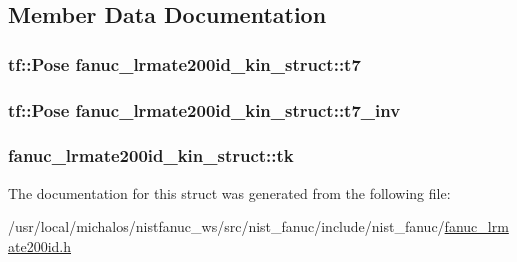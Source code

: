\subsection{Member Data Documentation}
\hypertarget{structfanuc__lrmate200id__kin__struct_affe117521f4d20a734362bcbaf0f87e6}{
\subsubsection[{t7}]{\setlength{\rightskip}{0pt plus 5cm}tf\-::\-Pose fanuc\-\_\-lrmate200id\-\_\-kin\-\_\-struct\-::t7}}\label{structfanuc__lrmate200id__kin__struct_affe117521f4d20a734362bcbaf0f87e6}
\hypertarget{structfanuc__lrmate200id__kin__struct_a92903cf8037c18791e4c93d1eabaf07b}{
\subsubsection[{t7\-\_\-inv}]{\setlength{\rightskip}{0pt plus 5cm}tf\-::\-Pose fanuc\-\_\-lrmate200id\-\_\-kin\-\_\-struct\-::t7\-\_\-inv}}\label{structfanuc__lrmate200id__kin__struct_a92903cf8037c18791e4c93d1eabaf07b}
\hypertarget{structfanuc__lrmate200id__kin__struct_a7e47a5d252d683e7c729ba1012f45529}{
\subsubsection[{tk}]{ fanuc\-\_\-lrmate200id\-\_\-kin\-\_\-struct\-::tk}}\label{structfanuc__lrmate200id__kin__struct_a7e47a5d252d683e7c729ba1012f45529}


The documentation for this struct was generated from the following file\-:\begin{DoxyCompactItemize}
\item 
/usr/local/michalos/nistfanuc\-\_\-ws/src/nist\-\_\-fanuc/include/nist\-\_\-fanuc/\hyperlink{fanuc__lrmate200id_8h}{fanuc\-\_\-lrmate200id.\-h}\end{DoxyCompactItemize}
